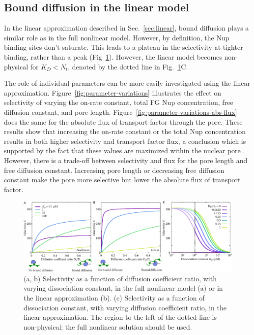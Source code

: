 \subsection{Bound diffusion in the linear model}

In the linear approximation described in Sec.~\ref{sec:linear}, bound diffusion plays a similar role as in the full nonlinear model.  However, by definition, the Nup binding sites don't saturate.  This leads to a plateau in the selectivity at tighter binding, rather than a peak (Fig~\ref{fig:linear-selectivity}).  However, the linear model becomes non-physical for $K_D < N_t$, denoted by the dotted line in Fig.~\ref{fig:linear-selectivity}C.

The role of individual parameters can be more easily investigated using the linear approximation.  Figure~\ref{fig:parameter-variations} illustrates the effect on selectivity of varying the on-rate constant, total FG Nup concentration, free diffusion constant, and pore length.  Figure~\ref{fig:parameter-variations-abs-flux} does the same for the absolute flux of transport factor through the pore.  These results show that increasing the on-rate constant or the total Nup concentration results in both higher selectivity and transport factor flux, a conclusion which is supported by the fact that these values are maximized within the nuclear pore \cite{milles15, hough15}.  However, there is a trade-off between selectivity and flux for the pore length and free diffusion constant.  Increasing pore length or decreasing free diffusion constant make the pore more selective but lower the absolute flux of transport factor.

\begin{figure}
\centering
\includegraphics[width=\linewidth]{figs/ch02/linear-selectivity.pdf}
\caption{(a, b) Selectivity as a function of diffusion coefficient
  ratio, with varying dissociation constant, in the full nonlinear
  model (a) or in the linear approximation (b).  (c) Selectivity as a
  function of dissociation constant, with varying diffusion
  coefficient ratio, in the linear approximation.  The region to the
  left of the dotted line is non-physical; the full nonlinear solution
  should be used.}
\label{fig:linear-selectivity}
\end{figure}

